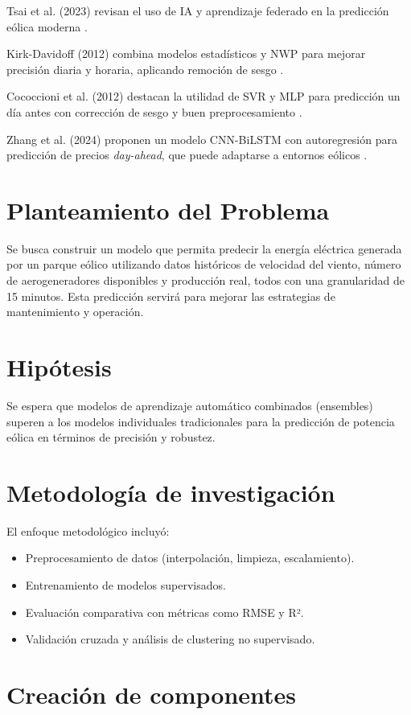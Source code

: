 \documentclass[conference]{IEEEtran}
\begin{document}
	Tsai et al. (2023) revisan el uso de IA y aprendizaje federado en la predicción eólica moderna \cite{tsai2023review}.
	
	Kirk-Davidoff (2012) combina modelos estadísticos y NWP para mejorar precisión diaria y horaria, aplicando remoción de sesgo \cite{kirk2012forecasting}.
	
	Cococcioni et al. (2012) destacan la utilidad de SVR y MLP para predicción un día antes con corrección de sesgo y buen preprocesamiento \cite{cococcioni2012oneday}.
	
	Zhang et al. (2024) proponen un modelo CNN-BiLSTM con autoregresión para predicción de precios \textit{day-ahead}, que puede adaptarse a entornos eólicos \cite{zhang2024cnnbilstm}.
	
	\section{Planteamiento del Problema}
	Se busca construir un modelo que permita predecir la energía eléctrica generada por un parque eólico utilizando datos históricos de velocidad del viento, número de aerogeneradores disponibles y producción real, todos con una granularidad de 15 minutos. Esta predicción servirá para mejorar las estrategias de mantenimiento y operación.
	
	\section{Hipótesis}
	Se espera que modelos de aprendizaje automático combinados (ensembles) superen a los modelos individuales tradicionales para la predicción de potencia eólica en términos de precisión y robustez.
	
	\section{Metodología de investigación}
	El enfoque metodológico incluyó:
	\begin{itemize}
		\item Preprocesamiento de datos (interpolación, limpieza, escalamiento).
		\item Entrenamiento de modelos supervisados.
		\item Evaluación comparativa con métricas como RMSE y R².
		\item Validación cruzada y análisis de clustering no supervisado.
	\end{itemize}
	
	\section{Creación de componentes}
\end{document}

